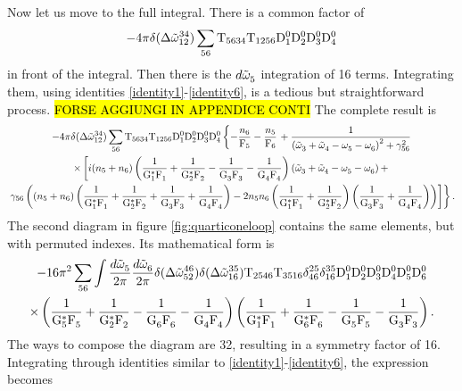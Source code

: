 Now let us move to the full integral. There is a common factor of
\begin{equation*}
    -4\pi\delta(\Delta{\tilde{\omega}}^{34}_{12})\sum_{56}\mathrm{T}_{5634}\mathrm{T}_{1256}\mathrm{D}_1^0\mathrm{D}_2^0\mathrm{D}_3^0\mathrm{D}_4^0
\end{equation*}
in front of the integral. Then there is the $d\tilde{\omega}^{}_5$ integration of 16 terms. Integrating them, using identities \eqref{identity1}-\eqref{identity6},
is a tedious but straightforward process. \hl{FORSE AGGIUNGI IN APPENDICE CONTI} The complete result is 
\begin{multline}
    -4\pi\delta(\Delta{\tilde{\omega}}^{34}_{12})\sum_{56}\mathrm{T}_{5634}\mathrm{T}_{1256}\mathrm{D}_1^0\mathrm{D}_2^0\mathrm{D}_3^0\mathrm{D}_4^0 \left\{ -\frac{n_6}{\mathrm{F}_5}-\frac{n_5}{\mathrm{F}_6}\right. + 
    \frac{1}{\left( \tilde{\omega}^{}_3 + \tilde{\omega}^{}_4 - \omega^{}_5 - \omega^{}_6\right)^2 + \gamma^2_{56}}\\
    \times \left[
    i(n_5 + n_6)\left(\dfrac{1}{\mathrm{G}_1^*\mathrm{F}_1^{}}+\dfrac{1}{\mathrm{G}_2^*\mathrm{F}_2^{}}-\dfrac{1}{\mathrm{G}_3^{}\mathrm{F}_3^{}}
    -\dfrac{1}{\mathrm{G}_4^{}\mathrm{F}_4^{}}\right)\left( \tilde{\omega}^{}_3 + \tilde{\omega}^{}_4 - \omega^{}_5 - \omega^{}_6\right) + 
    \right.\\
    \left.\left.
    \gamma_{56}\left((n_5 + n_6)\left(\dfrac{1}{\mathrm{G}_1^*\mathrm{F}_1^{}}+\dfrac{1}{\mathrm{G}_2^*\mathrm{F}_2^{}}+\dfrac{1}{\mathrm{G}_3^{}\mathrm{F}_3^{}}
    +\dfrac{1}{\mathrm{G}_4^{}\mathrm{F}_4^{}}\right) - 2n_5n_6 \left(\dfrac{1}{\mathrm{G}_1^*\mathrm{F}_1^{}}+\dfrac{1}{\mathrm{G}_2^*\mathrm{F}_2^{}}\right)\left(\dfrac{1}{\mathrm{G}_3^{}\mathrm{F}_3^{}}
    +\dfrac{1}{\mathrm{G}_4^{}\mathrm{F}_4^{}}\right)\right)
    \right]\right\}.
    \label{schannelfullcontribution}
\end{multline}
The second diagram in figure \ref{fig:quarticoneloop} contains the same elements, but with permuted indexes. Its mathematical form is 
\begin{multline}
    -16\pi^2\sum_{56}\int \frac{d\tilde{\omega}^{}_5}{2\pi}\frac{d\tilde{\omega}^{}_6}{2\pi}\delta(\Delta{\tilde{\omega}}^{46}_{52})\delta(\Delta{\tilde{\omega}}^{35}_{16})\mathrm{T}_{2546}\mathrm{T}_{3516}\delta^{25}_{46}
    \delta^{35}_{16}\mathrm{D}_1^0\mathrm{D}_2^0\mathrm{D}_3^0\mathrm{D}_4^0\mathrm{D}_5^0\mathrm{D}_6^0 \\ 
    \times \left(\dfrac{1}{\mathrm{G}_5^*\mathrm{F}_5^{}}+\dfrac{1}{\mathrm{G}_2^*\mathrm{F}_2^{}}-\dfrac{1}{\mathrm{G}_6^{}\mathrm{F}_6^{}}
    -\dfrac{1}{\mathrm{G}_4^{}\mathrm{F}_4^{}}\right)\left(\dfrac{1}{\mathrm{G}_1^*\mathrm{F}_1^{}}+\dfrac{1}{\mathrm{G}_6^*\mathrm{F}_6^{}}-\dfrac{1}{\mathrm{G}_5^{}\mathrm{F}_5^{}}
    -\dfrac{1}{\mathrm{G}_3^{}\mathrm{F}_3^{}}\right).
    \label{tchannel}
\end{multline}
The ways to compose the diagram are 32, resulting in a symmetry factor of 16. Integrating through 
identities similar to \eqref{identity1}-\eqref{identity6}, the expression becomes
